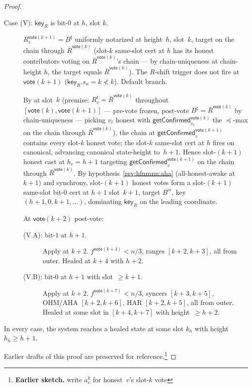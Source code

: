 \documentclass{article}
\newcommand{\key}{\mathsf{key}}
\newcommand{\vote}{\mathsf{vote}}
\newcommand{\comm}[1]{\bar{#1}}
\newcommand{\getConfirmed}{\textsf{getConfirmed}\xspace}
\theoremstyle{plain}
\theoremstyle{definition}
\theoremstyle{remark}
\newcommand{\AHA}{all-honest-awake\xspace}
\begin{document}
\begin{proof}
\begin{description}
\item[{Case (V): $\key_R$ is bit-$0$ at $h$, slot $k$.}]\hfill

$R_v^{\vote(k+1)} = B^\sharp$ uniformly notarized at height~$h$, slot~$k$, target on the chain through $\comm{R}^{\vote(k)}$ (slot-$k$ same-slot cert at $h$ has its honest contributors voting on $\comm{R}^{\vote(k)}$'s chain — by chain-uniqueness at chain-height $h$, the target equals $\comm{R}^{\vote(k)}$). The $R$-shift trigger does not fire at $\vote(k+1)$ ($\key_R.s_n = k \not< k$). Default branch.

By  at slot~$k$ (premise: $R_v^t = \comm{R}^{\vote(k)}$ throughout $[\vote(k), \vote(k+1)]$ — pre-vote frozen, post-vote $B^\sharp = \comm{R}^{\vote(k)}$ by chain-uniqueness — picking $v_\ell$ honest with $\getConfirmed_{v_\ell}^{\vote(k)}$ the $\preceq$-max on the chain through $\comm{R}^{\vote(k)}$), the chain at $\getConfirmed_v^{\vote(k+1)}$ contains every slot-$k$ honest vote; the slot-$k$ same-slot cert at $h$ fires on canonical, advancing canonical state-height to~$h+1$. Hence slot-$(k+1)$ honest cast at $h_c = h+1$ targeting $\getConfirmed_v^{\vote(k+1)}$ on the chain through $\comm{R}^{\vote(k)}$. By hypothesis~\ref{rev:hfnmnn:aha} (\AHA at $k+1$) and synchrony, slot-$(k+1)$ honest votes form a slot-$(k+1)$ same-slot bit-$0$ cert at $h+1$ slot~$k+1$, target $B^{\flat\flat}$, key $(h+1, 0, k+1, \ldots)$, dominating $\key_R$ on the leading coordinate.

At $\vote(k+2)$ post-vote:
\begin{description}
  \item[{(V.A): bit-$1$ at $h+1$.}] Apply  at $k+2$. $f^{\vote(k+4)} < n/3$, ranges $[k+2, k+3]$, all from outer. Healed at $k+4$ with $h+2$.
  \item[{(V.B): bit-$0$ at $h+1$ with slot~$\geq k+1$.}] Apply  at $k+2$. $f^{\vote(k+7)} < n/3$, syncers $[k+3, k+5]$, OHM/AHA $[k+2, k+6]$, HAR $[k+2, k+5]$, all from outer. Healed at some slot in $[k+4, k+7]$ with height~$\geq h+2$.
\end{description}
\end{description}

In every case, the system reaches a healed state at some slot $k_h$ with height $h_h \geq h+1$.

\noindent Earlier drafts of this proof are preserved for reference.\footnote{\textbf{Earlier sketch.} write $a^k_v$ for honest~$v$'s slot-$k$ vote
 
}
\end{proof}
\end{document}
